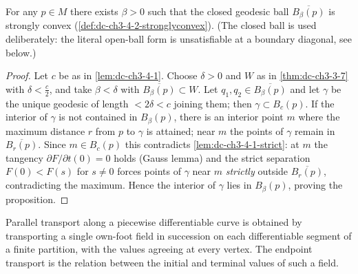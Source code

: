 \begin{proposition}
  \label{prop:dc-ch3-4-2}


  For any $p\in M$ there exists $\beta>0$ such that the closed geodesic ball $\overline{B_\beta(p)}$ is
  strongly convex (\cref{def:dc-ch3-4-2-stronglyconvex}). (The closed ball is used deliberately: the
  literal open-ball form is unsatisfiable at a boundary diagonal, see below.)
\end{proposition}
\begin{proof}
  \sketch

  Let $c$ be as in \cref{lem:dc-ch3-4-1}. Choose $\delta>0$ and $W$ as in \cref{thm:dc-ch3-3-7}
  with $\delta<\frac{c}{2}$, and take $\beta<\delta$ with $\overline{B_\beta(p)}\subset W$. Let
  $q_1,q_2\in\overline{B_\beta(p)}$ and let $\gamma$ be the unique geodesic of length
  $<2\delta<c$ joining them; then $\gamma\subset B_c(p)$. If the interior of
  $\gamma$ is not contained in $B_\beta(p)$, there is an interior point $m$ where the
  maximum distance $r$ from $p$ to $\gamma$ is attained; near $m$ the points of
  $\gamma$ remain in $\overline{B_r(p)}$. Since $m\in B_c(p)$ this contradicts
  \cref{lem:dc-ch3-4-1-strict}: at $m$ the tangency $\partial F/\partial t(0)=0$ holds
  (Gauss lemma) and the strict separation $F(0)<F(s)$ for $s\neq0$ forces points of
  $\gamma$ near $m$ \emph{strictly} outside $\overline{B_r(p)}$, contradicting the
  maximum. Hence the interior of $\gamma$ lies in $B_\beta(p)$, proving the proposition.
\end{proof}

\begin{definition}
  \label{def:dc-ch3-3-1-piecewise-transport}


  Parallel transport along a piecewise differentiable curve is obtained by
  transporting a single own-foot field in succession on each differentiable
  segment of a finite partition, with the values agreeing at every vertex.  The
  endpoint transport is the relation between the initial and terminal values of
  such a field.
\end{definition}

